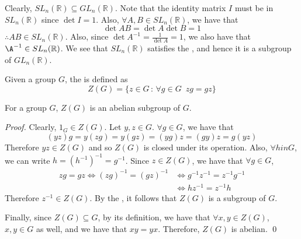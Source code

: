 \documentclass[notoc,notitlepage]{tufte-book}
\begin{document}
\begin{eg}\label{eg:special_linear_group_as_a_subgroup}
  Clearly, $SL_n(\mathbb{R}) \subseteq GL_n(\mathbb{R})$. Note that the identity matrix $I$ must be in $SL_n(\mathbb{R})$ since $\det I = 1$. Also, $\forall A, B \in SL_n(\mathbb{R})$, we have that
  \begin{equation*}
    \det AB = \det A \det B = 1
  \end{equation*}
  $\therefore AB \in SL_n(\mathbb{R})$. Also, since $\det A^{-1} = \frac{1}{\det A} = 1$, we also have that $\A^{-1} \in SL_n(\mathbb{R})$. We see that $SL_n(\mathbb{R})$ satisfies the , and hence it is a subgroup of $GL_n(\mathbb{R})$.
\end{eg}

\begin{defn}\label{defn:center_of_a_group}
  Given a group $G$, the  is defined as
  \begin{equation*}
    Z(G) = \{z \in G \, : \, \forall g \in G \enspace zg = gz \}
  \end{equation*}
\end{defn}

\begin{eg}
  For a group $G$, $Z(G)$ is an abelian subgroup of $G$.

  \begin{proof}
    Clearly, $1_G \in Z(G)$. Let $y, z \in G$. $\forall g \in G$, we have that
    \begin{equation*}
      (yz)g = y(zg) = y(gz) = (yg)z = (gy)z = g(yz)
    \end{equation*}
    Therefore $yz \in Z(G)$ and so $Z(G)$ is closed under its operation. Also, $\forall h 
    in G$, we can write $h = (h^{-1})^{-1} = g^{-1}$. Since $z \in Z(G)$, we have that $\forall g \in G$,
    \begin{align*}
      zg = gz \iff (zg)^{-1} = (gz)^{-1} &\iff g^{-1} z^{-1} = z^{-1} g^{-1} \\
          &\iff hz^{-1} = z^{-1} h
    \end{align*}
    Therefore $z^{-1} \in Z(G)$. By the , it follows that $Z(G)$ is a subgroup of $G$.

    Finally, since $Z(G) \subseteq G$, by its definition, we have that $\forall x, y \in Z(G)$, $x, y \in G$ as well, and we have that $xy = yx$. Therefore, $Z(G)$ is abelian. \qed
  \end{proof}
\end{eg}
\end{document}
